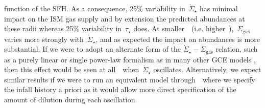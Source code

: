 \documentclass[ms.tex]{subfiles}
\begin{document}
function of the SFH.
As a consequence, 25\% variability in~$\dot{\Sigma}_\star$ has minimal impact
on the ISM gas supply and by extension the predicted abundances at these radii
whereas 25\% variability in~$\tau_\star$ does.
At smaller~\rgal~(i.e. higher~\oh),~$\Sigma_\text{gas}$ varies more strongly
with~$\dot{\Sigma}_\star$, and as expected the impact on abundances is more
substantial.
If we were to adopt an alternate form of the
$\dot{\Sigma}_\star - \Sigma_\text{gas}$ relation, such as a purely linear or
single power-law formalism as in many other GCE models
\citep[e.g.][]{Spitoni2019, Spitoni2021, Grisoni2021}, then this effect would
be seen at all~\oh~when~$\dot{\Sigma}_\star$ oscillates.
Alternatively, we expect similar results if we were to run an equivalent model
through~\vice~where we specify the infall history a priori as it would allow
more direct specification of the amount of dilution during each oscillation.
\end{document}
